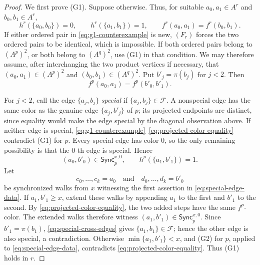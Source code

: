 \documentclass{amsart}
\numberwithin{equation}{section}
\theoremstyle{definition}
\theoremstyle{remark}
\begin{document}
\begin{proof}
We first prove (G1).  Suppose otherwise.  Thus, for suitable
$a_0,a_1\in A^r$ and $b_0,b_1\in A^r$,
\begin{equation}\label{eq:g1-counterexample}
 h^r(\{a_0,b_0\})=0,\qquad
 h^r(\{a_1,b_1\})=1,\qquad
 f^r(a_0,a_1)=f^r(b_0,b_1).
\end{equation}
If either ordered pair in \eqref{eq:g1-counterexample} is new, $(F_r)$
forces the two ordered pairs to be identical, which is impossible.
If both ordered pairs belong to $(A^p)^2$, or both belong to
$(A^q)^2$, use (G1) in that condition.  We may therefore assume,
after interchanging the two product vertices if necessary, that
$(a_0,a_1)\in(A^p)^2$ and $(b_0,b_1)\in(A^q)^2$.
Put $b'_j=\pi(b_j)$ for $j<2$.  Then
\begin{equation}\label{eq:projected-color-equality}
 f^p(a_0,a_1)=f^p(b'_0,b'_1).
\end{equation}

For $j<2$, call the edge $\{a_j,b_j\}$ \emph{special} if
$\{a_j,b_j\}\in\mathcal F$.  A nonspecial edge has the same color as the genuine
edge $\{a_j,b'_j\}$ of $p$; its projected endpoints are distinct,
since equality would make the edge special by the diagonal observation
above.  If neither
edge is special,
\eqref{eq:g1-counterexample}--\eqref{eq:projected-color-equality}
contradict (G1) for $p$.  Every special edge has color $0$, so the only
remaining possibility is that the $0$-th edge is special.  Hence
\begin{equation}\label{eq:special-edge-data}
 (a_0,b'_0)\in\mathsf{Sync}^{x,0}_p,\qquad
 h^p(\{a_1,b'_1\})=1.
\end{equation}
Let
\begin{displaymath}
 c_0,\ldots,c_k=a_0\quad\text{and}\quad
 d_0,\ldots,d_k=b'_0
\end{displaymath}
be synchronized walks from $x$ witnessing the first assertion in
\eqref{eq:special-edge-data}.  If $a_1,b'_1\geq x$, extend these walks
by appending $a_1$ to the first and $b'_1$ to the second.  By
\eqref{eq:projected-color-equality}, the two added steps have the same
$f^p$-color.  The extended walks therefore witness
$(a_1,b'_1)\in\mathsf{Sync}^{x,0}_p$.  Since $b'_1=\pi(b_1)$,
\eqref{eq:special-cross-edges} gives $\{a_1,b_1\}\in\mathcal F$; hence
the other edge is also special, a contradiction.  Otherwise
$\min\{a_1,b'_1\}<x$, and (G2) for $p$, applied to
\eqref{eq:special-edge-data}, contradicts
\eqref{eq:projected-color-equality}.  Thus (G1) holds in $r$.


\end{proof}
\end{document}
